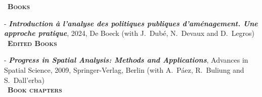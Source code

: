\documentclass[a4paper,12pt]{article}
\newcommand{\smalltitre}[1]{%
	\noindent \textbullet~\textsc{\textbf{#1}}
	\smallskip
	}
\begin{document}
\smalltitre{Books} \medskip

\noindent - \textit{\textbf{Introduction à l'analyse des politiques publiques d'aménagement. Une approche pratique}}, 2024, De Boeck (with J.~Dubé, N.~Devaux and D.~Legros) \\


\smalltitre{Edited Books}\medskip

\noindent - \textit{\textbf{Progress in Spatial Analysis: Methods and Applications}}, Advances in Spatial Science, 2009, Springer-Verlag, Berlin (with A.~Páez, R.~Buliung and S.~Dall'erba) \\


\smalltitre{Book chapters}\medskip
\end{document}
